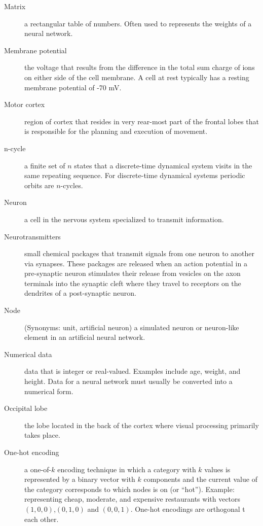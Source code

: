 \begin{description}
\item[Matrix] a rectangular table of numbers. Often used to represents the 
weights of a neural network.

\item[Membrane potential] the voltage that results from the difference in the total sum charge of ions on either side of the cell membrane. A cell at rest typically has a resting membrane potential of -70 mV. 


\item[Motor cortex] region of cortex that resides in very rear-most part of the frontal lobes that is responsible for the planning and execution of movement. 

\item[n-cycle] a finite set of $n$ states that a discrete-time dynamical system visits in the same repeating sequence. For discrete-time dynamical systems periodic orbits are $n$-cycles.

\item[Neuron] a cell in the nervous system specialized to transmit information.

\item[Neurotransmitters] small chemical packages that transmit signals from one neuron to another via synapses. These packages are released when an action potential in a pre-synaptic neuron stimulates their release from vesicles on the axon terminals into the synaptic cleft where they travel to receptors on the dendrites of a post-synaptic neuron. 

\item[Node] (Synonyms: unit, artificial neuron) a simulated neuron or neuron-like element in an artificial neural network. 

\item[Numerical data] data that is integer or real-valued. Examples include age, weight, and height. Data for a neural network must usually be converted into a numerical form.

\item[Occipital lobe] the lobe located in the back of the cortex where visual processing primarily takes place. 

\item[One-hot encoding] a one-of-$k$ encoding technique in which  a category with $k$ values is represented by a binary vector with $k$ components and the current value of the category corresponds to which nodes is on (or ``hot''). Example: representing cheap, moderate, and expensive restaurants with vectors $(1,0,0)$,$(0,1,0)$ and $(0,0,1)$. One-hot encodings are orthogonal t each other.


\end{description}

